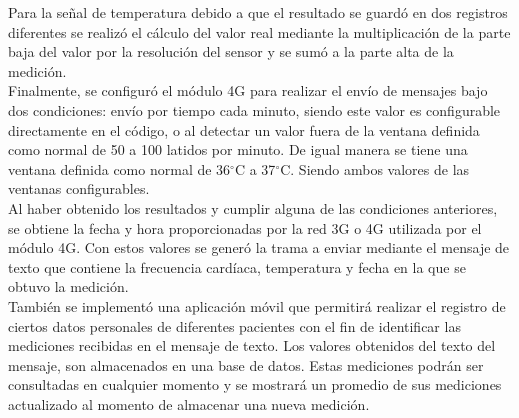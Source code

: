 Para la señal de temperatura debido a que el resultado se guardó en dos registros diferentes se realizó el cálculo del valor real mediante la multiplicación de la parte baja del valor por la resolución del sensor y se sumó a la parte alta de la medición.\\

Finalmente, se configuró el módulo 4G para realizar el envío de mensajes bajo dos condiciones: envío por tiempo cada minuto, siendo este valor es configurable directamente en el código, o al detectar un valor fuera de la ventana definida como normal de 50 a 100 latidos por minuto. De igual manera se tiene una ventana definida como normal de 36$^{\circ}$C a 37$^{\circ}$C. Siendo ambos valores de las ventanas configurables. \\

Al haber obtenido los resultados y cumplir alguna de las condiciones anteriores, se obtiene la fecha y hora proporcionadas por la red 3G o 4G utilizada por el módulo 4G. Con estos valores se generó la trama a enviar mediante el mensaje de texto que contiene la frecuencia cardíaca, temperatura y fecha en la que se obtuvo la medición. \\

También se implementó una aplicación móvil que permitirá realizar el registro de ciertos datos personales de diferentes pacientes con el fin de identificar las mediciones recibidas en el mensaje de texto. Los valores obtenidos del texto del mensaje, son almacenados en una base de datos. Estas mediciones podrán ser consultadas en cualquier momento y se mostrará un promedio de sus mediciones actualizado al momento de almacenar una nueva medición.